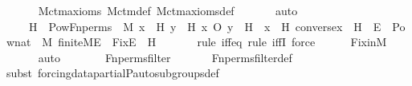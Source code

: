 \begin{isabellebody}
\ \ \ \ \isamarkupfalse%
\ M{\isacharunderscore}{\kern0pt}ctm{\isacharunderscore}{\kern0pt}axioms\ M{\isacharunderscore}{\kern0pt}ctm{\isacharunderscore}{\kern0pt}def\ M{\isacharunderscore}{\kern0pt}ctm{\isacharunderscore}{\kern0pt}axioms{\isacharunderscore}{\kern0pt}def\ \isanewline
\ \ \ \ \isamarkupfalse%
\ auto\isanewline
\ \ \isamarkupfalse%
\ \isamarkupfalse%
\ {\isachardoublequoteopen}{\isachardot}{\kern0pt}{\isachardot}{\kern0pt}{\isachardot}{\kern0pt}\ {\isacharequal}{\kern0pt}\ {\isacharbraceleft}{\kern0pt}\ H\ {\isasymin}\ Pow{\isacharparenleft}{\kern0pt}Fn{\isacharunderscore}{\kern0pt}perms{\isacharparenright}{\kern0pt}\ {\isasyminter}\ M{\isachardot}{\kern0pt}\ {\isacharparenleft}{\kern0pt}{\isasymforall}x\ {\isasymin}\ H{\isachardot}{\kern0pt}\ {\isasymforall}y\ {\isasymin}\ H{\isachardot}{\kern0pt}\ x\ O\ y\ {\isasymin}\ H{\isacharparenright}{\kern0pt}\ {\isasymand}\ {\isacharparenleft}{\kern0pt}{\isasymforall}x\ {\isasymin}\ H{\isachardot}{\kern0pt}\ converse{\isacharparenleft}{\kern0pt}x{\isacharparenright}{\kern0pt}\ {\isasymin}\ H{\isacharparenright}{\kern0pt}\ {\isasymand}\ {\isacharparenleft}{\kern0pt}{\isasymexists}E\ {\isasymin}\ Pow{\isacharparenleft}{\kern0pt}nat{\isacharparenright}{\kern0pt}\ {\isasyminter}\ M{\isachardot}{\kern0pt}\ finite{\isacharunderscore}{\kern0pt}M{\isacharparenleft}{\kern0pt}E{\isacharparenright}{\kern0pt}\ {\isasymand}\ Fix{\isacharparenleft}{\kern0pt}E{\isacharparenright}{\kern0pt}\ {\isasymsubseteq}\ H{\isacharparenright}{\kern0pt}\ {\isacharbraceright}{\kern0pt}{\isachardoublequoteclose}\ \isanewline
\ \ \ \ \isamarkupfalse%
{\isacharparenleft}{\kern0pt}rule\ iff{\isacharunderscore}{\kern0pt}eq{\isacharcomma}{\kern0pt}\ rule\ iffI{\isacharcomma}{\kern0pt}\ force{\isacharparenright}{\kern0pt}\isanewline
\ \ \ \ \isamarkupfalse%
\ Fix{\isacharunderscore}{\kern0pt}in{\isacharunderscore}{\kern0pt}M\isanewline
\ \ \ \ \isamarkupfalse%
\ auto\isanewline
\ \ \isamarkupfalse%
\ \isamarkupfalse%
\ {\isachardoublequoteopen}{\isachardot}{\kern0pt}{\isachardot}{\kern0pt}{\isachardot}{\kern0pt}\ {\isacharequal}{\kern0pt}\ Fn{\isacharunderscore}{\kern0pt}perms{\isacharunderscore}{\kern0pt}filter{\isachardoublequoteclose}\ \isanewline
\ \ \ \ \isamarkupfalse%
\ Fn{\isacharunderscore}{\kern0pt}perms{\isacharunderscore}{\kern0pt}filter{\isacharunderscore}{\kern0pt}def\isanewline
\ \ \ \ \isamarkupfalse%
{\isacharparenleft}{\kern0pt}subst\ forcing{\isacharunderscore}{\kern0pt}data{\isacharunderscore}{\kern0pt}partial{\isachardot}{\kern0pt}P{\isacharunderscore}{\kern0pt}auto{\isacharunderscore}{\kern0pt}subgroups{\isacharunderscore}{\kern0pt}def{\isacharparenright}{\kern0pt}\isanewline

\end{isabellebody}
